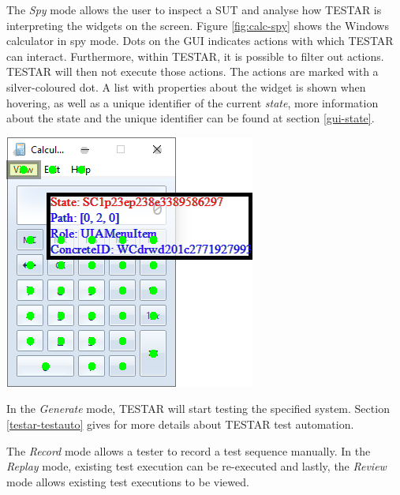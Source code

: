 The \emph{Spy} mode allows the user to inspect a SUT and analyse how TESTAR is interpreting the widgets on the screen. Figure \ref{fig:calc-spy} shows the Windows calculator in spy mode. Dots on the GUI indicates actions with which TESTAR can interact. Furthermore, within TESTAR, it is possible to filter out actions. TESTAR will then not execute those actions. The actions are marked with a silver-coloured dot. A list with properties about the widget is shown when hovering, as well as a unique identifier of the current \emph{state}, more information about the state and the unique identifier can be found at section \ref{gui-state}.\par

\begingroup
\captionsetup{type=figure}
\includegraphics{pics/calc-state.png}
\label{fig:calc-spy}
\endgroup

In the \emph{Generate} mode, TESTAR will start testing the specified system. Section \ref{testar-testauto} gives for more details about TESTAR test automation.

The \emph{Record} mode allows a tester to record a test sequence manually. In the \emph{Replay} mode, existing test execution can be re-executed and lastly, the \emph{Review} mode allows existing test executions to be viewed.


